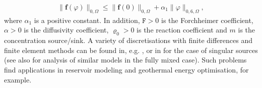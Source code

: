 \documentclass[11pt, reqno, a4paper, twoside]{article}
\renewcommand{\bf}{\boldsymbol{f}}
\newcommand{\rF}{\mathtt{F}}
\numberwithin{equation}{section}
\numberwithin{remark}{section}
\numberwithin{figure}{section}
\numberwithin{table}{section}
\begin{document}
\begin{align}\label{eq:lip.bound.f}\|\bf(\varphi)\|_{0,\Omega}\leq \|\bf(0)\|_{0,\Omega}+ \alpha_1\|\varphi\|_{0,6,\Omega},\end{align} 
where  \(\alpha_1\) is a positive constant.
 In addition,  $\rF>0$ is the Forchheimer coefficient, $\alpha>0$ is the diffusivity coefficient, $\varrho_0>0$ is the reaction coefficient  and $m$ is the concentration source/sink. A variety of discretisations with finite differences and finite element methods can be found in, e.g. \cite{deugoue2022numerical,huang2025numerical,bonetti2025conforming}, or in \cite{allendes2023numerical} for the case of singular sources (see also \cite{caucao2021fully,gatica2022p} for analysis of similar models in the fully mixed case). Such problems find applications in reservoir modeling and geothermal energy optimisation, for example.
\end{document}

